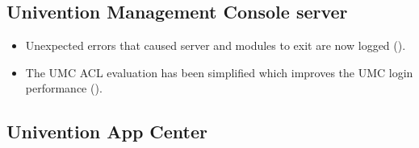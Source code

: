 \subsection{Univention Management Console server}
\begin{itemize}
\item Unexpected errors that caused  server and modules to exit are now logged ().

\item The UMC ACL evaluation has been simplified which improves the UMC login
  performance ().

\end{itemize}

\subsection{Univention App Center}
